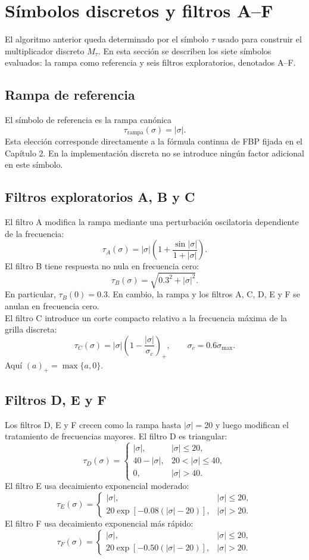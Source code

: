 \section{Símbolos discretos y filtros A--F}

El algoritmo anterior queda determinado por el símbolo $\tau$ usado para construir el multiplicador discreto $M_\tau$. En esta sección se describen los siete símbolos evaluados: la rampa como referencia y seis filtros exploratorios, denotados A--F.

\subsection*{Rampa de referencia}

El símbolo de referencia es la rampa canónica
\[
\tau_{\mathrm{rampa}}(\sigma)=|\sigma|.
\]
Esta elección corresponde directamente a la fórmula continua de FBP fijada en el Capítulo 2. En la implementación discreta no se introduce ningún factor adicional en este símbolo.

\subsection*{Filtros exploratorios A, B y C}

El filtro A modifica la rampa mediante una perturbación oscilatoria dependiente de la frecuencia:
\[
\tau_A(\sigma)
=
|\sigma|\left(1+\frac{\sin|\sigma|}{1+|\sigma|}\right).
\]
El filtro B tiene respuesta no nula en frecuencia cero:
\[
\tau_B(\sigma)=\sqrt{0.3^2+|\sigma|^2}.
\]
En particular, $\tau_B(0)=0.3$. En cambio, la rampa y los filtros A, C, D, E y F se anulan en frecuencia cero.\\

El filtro C introduce un corte compacto relativo a la frecuencia máxima de la grilla discreta:
\[
\tau_C(\sigma)
=
|\sigma|\left(1-\frac{|\sigma|}{\sigma_c}\right)_+,
\qquad
\sigma_c=0.6\sigma_{\max}.
\]
Aquí $(a)_+=\max\{a,0\}$.

\subsection*{Filtros D, E y F}

Los filtros D, E y F crecen como la rampa hasta $|\sigma|=20$ y luego modifican el tratamiento de frecuencias mayores. El filtro D es triangular:
\[
\tau_D(\sigma)=
\begin{cases}
|\sigma|, & |\sigma|\le 20,\\
40-|\sigma|, & 20<|\sigma|\le 40,\\
0, & |\sigma|>40.
\end{cases}
\]
El filtro E usa decaimiento exponencial moderado:
\[
\tau_E(\sigma)=
\begin{cases}
|\sigma|, & |\sigma|\le 20,\\
20\exp[-0.08(|\sigma|-20)], & |\sigma|>20.
\end{cases}
\]
El filtro F usa decaimiento exponencial más rápido:
\[
\tau_F(\sigma)=
\begin{cases}
|\sigma|, & |\sigma|\le 20,\\
20\exp[-0.50(|\sigma|-20)], & |\sigma|>20.
\end{cases}
\]

